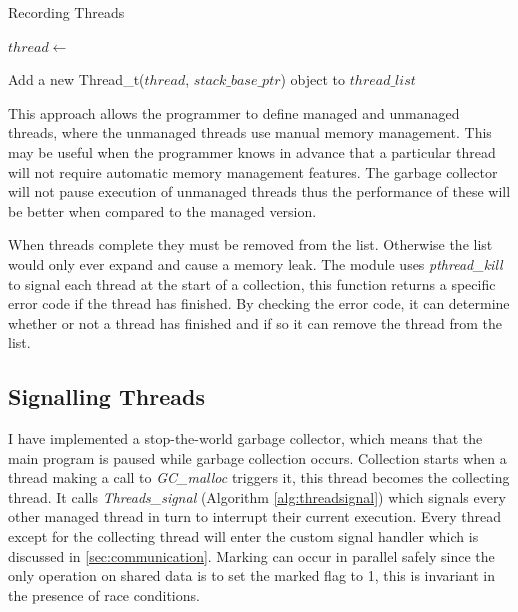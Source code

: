 \documentclass[../diss.tex]{subfiles}
\begin{document}
\begin{algorithm}
\caption{Recording Threads}
\label{alg:threadsaddexplicit}
\begin{algorithmic}


\State $thread\gets $ 

\State
\State {}

\State Add a new Thread\_t($thread$, $stack\_base\_ptr$) object to $thread\_list$

\State {}

\EndFunction

\end{algorithmic}
\end{algorithm}

This approach allows the programmer to define managed and unmanaged threads, where the unmanaged threads use manual memory management. This may be useful when the programmer knows in advance that a particular thread will not require automatic memory management features. The garbage collector will not pause execution of unmanaged threads thus the performance of these will be better when compared to the managed version.

When threads complete they must be removed from the list. Otherwise the list would only ever expand and cause a memory leak. The module uses \emph{pthread\_kill} to signal each thread at the start of a collection, this function returns a specific error code if the thread has finished. By checking the error code, it can determine whether or not a thread has finished and if so it can remove the thread from the list. 

\subsection{Signalling Threads} \label{sec:signallingthreads}

I have implemented a stop-the-world garbage collector, which means that the main program is paused while garbage collection occurs. Collection starts when a thread making a call to \emph{GC\_malloc} triggers it, this thread becomes the collecting thread. It calls \emph{Threads\_signal} (Algorithm \ref{alg:threadsignal}) which signals every other managed thread in turn to interrupt their current execution. Every thread except for the collecting thread will enter the custom signal handler which is discussed in \cref{sec:communication}. Marking can occur in parallel safely since the only operation on shared data is to set the marked flag to 1, this is invariant in the presence of race conditions.
\end{document}
